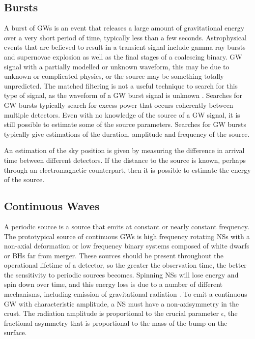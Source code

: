 \documentclass[binding=0.6cm, LaM]{sapthesis}
\begin{document}
\subsection{Bursts}
	A burst of GWs is an event that releases a large amount 
	of gravitational energy over a very short period of time, typically less than a few seconds.  
	Astrophysical events that are believed to result in a transient signal 
	include gamma ray bursts and supernovae explosion as well as the final stages of a coalescing binary. 
	GW signal with a partially modelled or unknown waveform, 
	this may be due to unknown or complicated physics, or the source may be something totally unpredicted. 
	The matched filtering is not a useful technique to search for this type of signal, 
	as the waveform of a GW burst signal is unknown \cite{3}. 
	Searches for GW bursts typically search for excess power that occurs coherently between multiple detectors.  
	Even with no knowledge of the source of a GW signal, 
	it is still possible to estimate some of the source parameters. 
	Searches for GW bursts typically give estimations of the duration, 
	amplitude and frequency of the source.

	An estimation of the sky position is given by measuring the difference 
	in arrival time between different detectors. 
	If the distance to the source is known, 
	perhaps through an electromagnetic counterpart, 
	then it is possible to estimate the energy of the source. 

\subsection{Continuous Waves}
	A periodic source is a source that emits at constant or nearly constant frequency.
	The prototypical source of continuous GWs is high frequency rotating NSs 
	with a non-axial deformation or low frequency binary systems 
	composed of white dwarfs or BHs far from merger. 
	These sources should be present throughout the operational lifetime of a detector, 
	so the greater the observation time, the better the sensitivity to periodic sources becomes. 
	Spinning NSs will lose energy and spin down over time, 
	and this energy loss is due to a number of different mechanisms, 
	including emission of gravitational radiation \cite{3}. 
	To emit a continuous GW with characteristic amplitude, 
	a NS must have a non-axisymmetry in the crust. 
	The radiation amplitude is proportional to the crucial parameter $\epsilon$, 
	the fractional asymmetry that is proportional to the mass of the bump on the surface.
\end{document}
